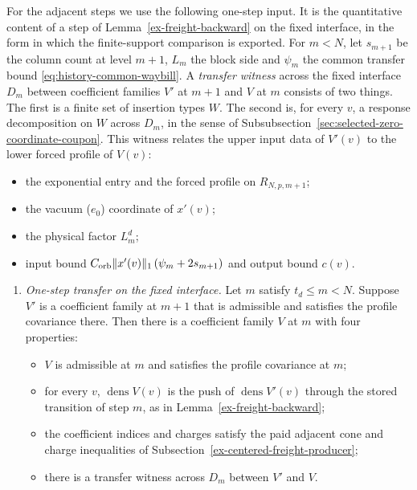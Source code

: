 For the adjacent steps we use the following one-step input. It is the
quantitative content of a step of Lemma~\ref{ex-freight-backward} on the
fixed interface, in the form in which the finite-support comparison is exported.
For $m<N$, let $s_{m+1}$ be the column count at level $m+1$, $L_m$ the
block side and $\psi_m$ the common transfer bound
\eqref{eq:history-common-waybill}. A \emph{transfer witness} across the fixed interface
$D_m$ between coefficient families $V'$ at $m+1$ and $V$ at $m$ consists of two
things. The first is a finite set of insertion types $W$. The second is, for every $v$, a
response decomposition on $W$ across $D_m$, in the sense of
Subsubsection~\ref{sec:selected-zero-coordinate-coupon}. This witness relates
the upper input data of $V'(v)$ to the lower forced profile of $V(v)$:
\begin{itemize}
\item the exponential entry and the forced profile on $R_{N,p,m+1}$;
\item the vacuum ($e_0$) coordinate of $x'(v)$;
\item the physical factor $L_m^d$;
\item input bound
  $C_{\rm orb}\|x'(v)\|_1\,(\psi_m+2s_{m+1})$ and output bound $c(v)$.
\end{itemize}

\begin{enumerate}
\item[(RS)] \emph{One-step transfer on the fixed interface.} Let $m$ satisfy
  $t_d\le m<N$. Suppose $V'$ is a coefficient family at $m+1$ that is admissible and
  satisfies the profile covariance there. Then there is a coefficient family $V$ at
  $m$ with four properties:
  \begin{itemize}
  \item $V$ is admissible at $m$ and satisfies the profile covariance at $m$;
  \item for every $v$, $\operatorname{dens}V(v)$ is the push of
    $\operatorname{dens}V'(v)$ through the stored transition of step
    $m$, as in Lemma~\ref{ex-freight-backward};
  \item the coefficient indices and charges satisfy the paid adjacent
    cone and charge inequalities of
    Subsection~\ref{ex-centered-freight-producer};
  \item there is a transfer witness across $D_m$ between $V'$ and $V$.
  \end{itemize}
\end{enumerate}

